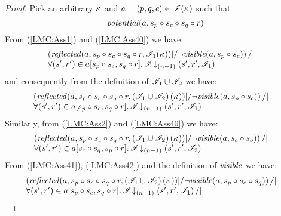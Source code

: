 \begin{lemma}
\begin{proof}
\noindent Pick an arbitrary $\kappa_{}$ and $a = (p, q, c) \in\mathscr{I}(\kappa_{})$ such that
\begin{equation}
	\mathit{potential}(a, s_p \circ s_c \circ s_q \circ r) \label{LMC:Ass40}
\end{equation}
From (\ref{LMC:Ass1}) and (\ref{LMC:Ass40}) we have: 
%
\begin{align*}
	& 
	\begin{array}{@{} l @{}}
		\left( \m{reflected}(a,s_p \composeL s_c \composeL s_q \composeL r,\lmod_1(\ca{})) |/ \neg\m{visible}(a,s_p \composeL s_c) \right) /| \\
		\for{(s', r') \in a[s_p \composeL s_c, s_q \composeL r]} \extendsAMUpto{\lmod}{(n-1)}{s'}{r'}{\lmod_1}
	\end{array}	  
\end{align*}
%
and consequently from the definition of $\mathscr{I}_1 \cup \mathscr{I}_2$ we have: 
%
\begin{align}
	& \begin{array}{@{} l @{}}
		\left( \m{reflected}(a,s_p \composeL s_c \composeL s_q \composeL r, \left(\lmod_1 \cup \lmod_2 \right)(\ca{})) |/ \neg\m{visible}(a,s_p \composeL s_c) \right) /| \\
		\for{(s', r') \in a[s_p \composeL s_c, s_q \composeL r]} \extendsAMUpto{\lmod}{(n-1)}{s'}{r'}{\lmod_1}
	\end{array}	  \label{LMC:Ass41}
\end{align}
Similarly, from (\ref{LMC:Ass2}) and (\ref{LMC:Ass40}) we have: 
%
\begin{align}
	& \begin{array}{@{} l @{}}
		\left( \m{reflected}(a,s_p \composeL s_c \composeL s_q \composeL r, \left(\lmod_1 \cup \lmod_2 \right)(\ca{})) |/ \neg\m{visible}(a,s_c \composeL s_q) \right) /| \\
		\for{(s', r') \in a[s_c \composeL s_q, s_p \composeL r]} \extendsAMUpto{\lmod}{(n-1)}{s'}{r'}{\lmod_2}
	\end{array} \label{LMC:Ass42}
\end{align}
From (\ref{LMC:Ass41}), (\ref{LMC:Ass42}) and the definition of $\mathit{visible}$ we have: 
%
\begin{align}
	& \begin{array}{@{} l @{}}
		\left( \m{reflected}(a,s_p \composeL s_c \composeL s_q \composeL r, \left(\lmod_1 \cup \lmod_2 \right)(\ca{})) |/ \neg\m{visible}(a,s_p \composeL s_c \composeL s_q) \right) /| \\
		\for{(s', r') \in a[s_p \composeL s_c, s_q \composeL r]} \extendsAMUpto{\lmod}{(n-1)}{s'}{r'}{\lmod_1} /| \\

\end{array}
\end{align}
\end{proof}
\end{lemma}
